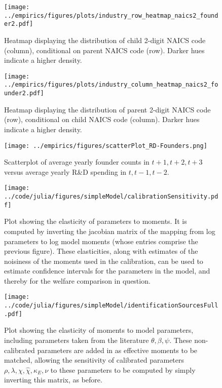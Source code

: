 \documentclass[11pt,english]{article}
\begin{document}
\setcounter{figure}{0}
\renewcommand{\thefigure}{\Alph{section}\arabic{figure}}

\begin{figure}[!htb]
	\centering
	\texttt{[image: ../empirics/figures/plots/industry\_row\_heatmap\_naics2\_founder2.pdf]}
	\caption{Heatmap displaying the distribution of child 2-digit NAICS code (column), conditional on parent NAICS code (row). Darker hues indicate a higher density.}
	\label{figure:industry_row_heatmap_naics2_founder2}
\end{figure}

\begin{figure}[!htb]
	\centering
	\texttt{[image: ../empirics/figures/plots/industry\_column\_heatmap\_naics2\_founder2.pdf]}
	\caption{Heatmap displaying the distribution of parent 2-digit NAICS code (row), conditional on child NAICS code (column). Darker hues indicate a higher density.}
	\label{figure:industry_column_heatmap_naics2_founder2}
\end{figure}

\begin{figure}[!htb]
	\centering
	\texttt{[image: ../empirics/figures/scatterPlot\_RD-Founders.png]}
	\caption{Scatterplot of average yearly founder counts in $t+1,t+2,t+3$ versus average yearly R\&D spending in $t,t-1,t-2$.}
	\label{figure:scatterPlot_RD-Founders}
\end{figure}

\begin{figure}[]
	\texttt{[image: ../code/julia/figures/simpleModel/calibrationSensitivity.pdf]}
	\caption{Plot showing the elasticity of parameters to moments. It is computed by inverting the jacobian matrix of the mapping from log parameters to log model moments (whose entries comprise the previous figure). These elasticities, along with estimates of the noisiness of the moments used in the calibration, can be used to estimate confidence intervals for the parameters in the model, and thereby for the welfare comparison in question.}
	\label{calibration_sensitivity}
\end{figure}

\begin{figure}[]
	\texttt{[image: ../code/julia/figures/simpleModel/identificationSourcesFull.pdf]}
	\caption{Plot showing the elasticity of moments to model parameters, including parameters taken from the literature $\theta , \beta, \psi$. These non-calibrated parameters are added in as effective moments to be matched, allowing the sensitivity of calibrated parameters $\rho, \lambda, \chi, \hat{\chi}, \kappa_E, \nu$ to these parameters to be computed by simply inverting this matrix, as before.}
	\label{calibration_identificationSources_full}
\end{figure}
\end{document}
